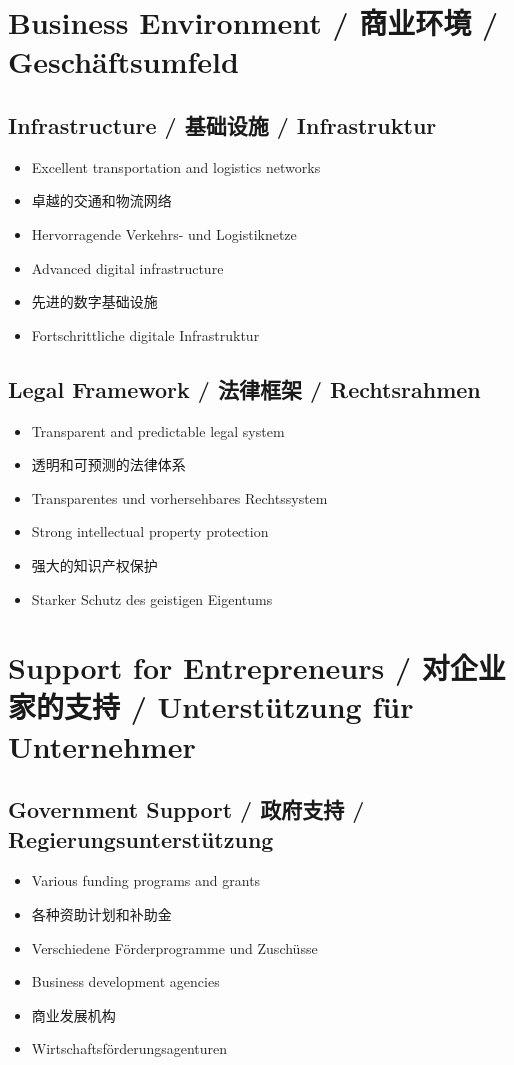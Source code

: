 \section{Business Environment / 商业环境 / Geschäftsumfeld}

\subsection{Infrastructure / 基础设施 / Infrastruktur}
\begin{itemize}
    \item Excellent transportation and logistics networks
    \item 卓越的交通和物流网络
    \item Hervorragende Verkehrs- und Logistiknetze
    \item Advanced digital infrastructure
    \item 先进的数字基础设施
    \item Fortschrittliche digitale Infrastruktur
\end{itemize}

\subsection{Legal Framework / 法律框架 / Rechtsrahmen}
\begin{itemize}
    \item Transparent and predictable legal system
    \item 透明和可预测的法律体系
    \item Transparentes und vorhersehbares Rechtssystem
    \item Strong intellectual property protection
    \item 强大的知识产权保护
    \item Starker Schutz des geistigen Eigentums
\end{itemize}

\section{Support for Entrepreneurs / 对企业家的支持 / Unterstützung für Unternehmer}

\subsection{Government Support / 政府支持 / Regierungsunterstützung}
\begin{itemize}
    \item Various funding programs and grants
    \item 各种资助计划和补助金
    \item Verschiedene Förderprogramme und Zuschüsse
    \item Business development agencies
    \item 商业发展机构
    \item Wirtschaftsförderungsagenturen
\end{itemize}


